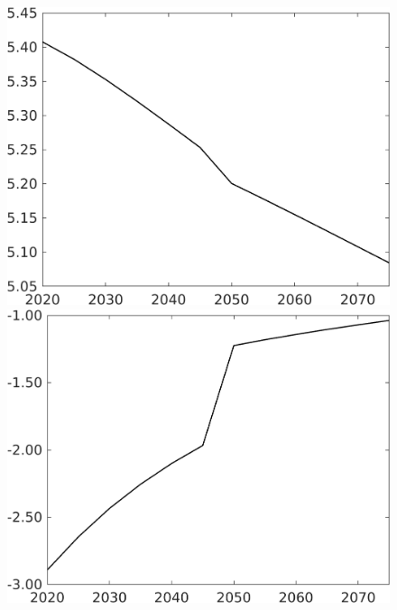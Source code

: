 \documentclass[12pt]{article}
\begin{document}
\begin{figure}[h!!]
\begin{minipage}[]{0.32\textwidth}
\end{minipage}		
\begin{minipage}[]{0.32\textwidth}
\includegraphics[width=1\textwidth]{../../codding_model/own_basedOnFried/optimalPol_010922_revision/figures/all_13Sept22/CompTaufPER_bytaul_Reg0_sff_spillover0_nsk0_xgr0_knspil0_sep1_LFlimit1_emsbase0_countec0_GovRev0_etaa0.79_lgd0.png}
\end{minipage}		
\begin{minipage}[]{0.32\textwidth}
\includegraphics[width=1\textwidth]{../../codding_model/own_basedOnFried/optimalPol_010922_revision/figures/all_13Sept22/CompTaufPER_bytaul_Reg0_sg_spillover0_nsk0_xgr0_knspil0_sep1_LFlimit1_emsbase0_countec0_GovRev0_etaa0.79_lgd0.png}

\end{minipage}
\end{figure}
\end{document}
